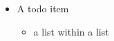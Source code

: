 \begin{itemize}
    \item A todo item
    \begin{itemize}
        \item a list within a list
    \end{itemize}{}
    
\end{itemize}{}